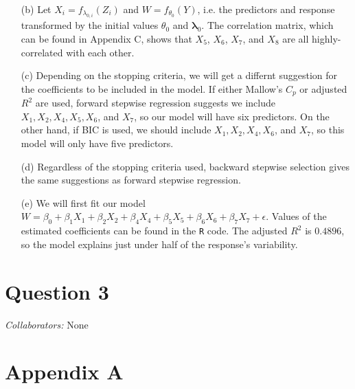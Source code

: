 \documentclass[10pt]{article}
\newcommand{\mycolaba}[1]{\textcolor{colabcol}{\textsl{Collaborators:}} #1}
\begin{document}
\begin{itemize}
    \item[(b)] Let \(X_i = f_{\lambda_{0,i}}(Z_i)\) and \(W = f_{\theta_0}(Y)\), i.e. the predictors and response transformed by the initial values \(\theta_0\)
    and \(\bm{\lambda}_0\). 
    The correlation matrix, which can be found in Appendix C, shows that 
    \(X_5\), \(X_6\), \(X_7\), and \(X_8\) are all highly-correlated with each other. 

    \item[(c)] Depending on the stopping criteria, we will get a differnt suggestion for the coefficients to be included in the model. If either Mallow's \(C_p\)
    or adjusted \(R^2\) are used, forward stepwise regression suggests we include \(X_1, X_2, X_4, X_5, X_6\), and \(X_7\), so our model will have six predictors.
    On the other hand, if BIC is used, we should include \(X_1, X_2, X_4, X_6\), and \(X_7\), so this model will only have five predictors.

    \item[(d)] Regardless of the stopping criteria used, backward stepwise selection gives the same suggestions as forward stepwise regression. 

    \item[(e)] We will first fit our model \(W = \beta_0 + \beta_1 X_1 + \beta_2 X_2 + \beta_4 X_4 + \beta_5 X_5 + \beta_6 X_6 + \beta_7 X_7 + \epsilon \). 
    Values of the estimated coefficients can be found in the \texttt{R} code. The adjusted \(R^2\) is \(0.4896\), so the model explains just under half of the 
    response's variability. 
\end{itemize}

\section{Question 3} \noindent
\mycolaba{None}


\section{Appendix A} \noindent
\end{document}
